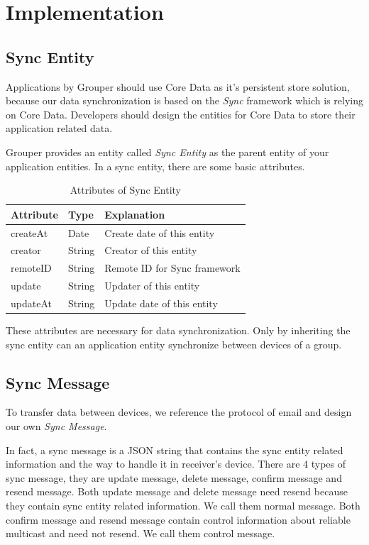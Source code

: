 \documentclass[twocolumn,10pt]{article}
\begin{document}
\section{Implementation}

\subsection{Sync Entity}

Applications by Grouper should use Core Data as it's persistent store solution, because our data synchronization is based on the \emph{Sync} framework which is relying on Core Data. Developers should design the entities for Core Data to store their application related data.

Grouper provides an entity called \emph{Sync Entity} as the parent entity of your application entities. In a sync entity, there are some basic attributes.

\begin{table}[]
	\centering
	\caption{Attributes of Sync Entity}
	\begin{tabular}{lll}
		\hline
		\textbf{Attribute} & \textbf{Type} & \textbf{Explanation}         \\ \hline
		createAt           & Date          & Create date of this entity   \\ \hline
		creator            & String        & Creator of this entity       \\ \hline
		remoteID           & String        & Remote ID for Sync framework \\ \hline
		update             & String        & Updater of this entity       \\ \hline
		updateAt           & String        & Update date of this entity   \\ \hline
	\end{tabular}
\end{table}

These attributes are necessary for data synchronization. Only by inheriting the sync entity can an application entity synchronize between devices of a group.

\subsection{Sync Message}

To transfer data between devices, we reference the protocol of email and design our own \emph{Sync Message}.

In fact, a sync message is a JSON string that contains the sync entity related information and the way to handle it in receiver’s device. There are 4 types of sync message, they are update message, delete message, confirm message and resend message. Both update message and delete message need resend because they contain sync entity related information. We call them normal message. Both confirm message and resend message contain control information about reliable multicast and need not resend. We call them control message.
\end{document}
